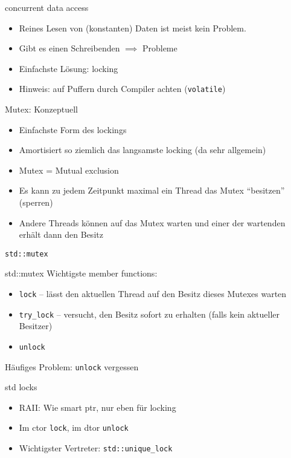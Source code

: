 \begin{frame}{concurrent data access}
	\begin{itemize}
		\item Reines Lesen von (konstanten) Daten ist meist kein Problem.
		\item Gibt es einen Schreibenden $\implies$ Probleme
		\item Einfachste Lösung: locking
		\item Hinweis: auf Puffern durch Compiler achten (\texttt{volatile})
	\end{itemize}
	
	\pause
	
	\begin{block}{Mutex: Konzeptuell}
		\begin{itemize}
			\item Einfachste Form des lockings
			\item Amortisiert so ziemlich das langsamste locking (da sehr allgemein)
			\item Mutex = Mutual exclusion
			\item Es kann zu jedem Zeitpunkt maximal ein Thread das Mutex \enquote{besitzen} (sperren)
			\item Andere Threads können auf das Mutex warten und einer der wartenden erhält dann den Besitz
		\end{itemize}
	\end{block}
\end{frame}

\begin{frame}{ \texttt{std::mutex} }
	\begin{block}{std::mutex}
		Wichtigste member functions:
		\begin{itemize}
			\item \texttt{lock} -- lässt den aktuellen Thread auf den Besitz dieses Mutexes warten
			\item \texttt{try\_lock} -- versucht, den Besitz sofort zu erhalten (falls kein aktueller Besitzer)
			\item \texttt{unlock}
		\end{itemize}
	\end{block}
	
	\pause
	
	\alert{Häufiges Problem: \texttt{unlock} vergessen}
	\begin{block}{std locks}
		\begin{itemize}
			\item RAII: Wie smart ptr, nur eben für locking
			\item Im ctor \texttt{lock}, im dtor \texttt{unlock}
			\item Wichtigster Vertreter: \texttt{std::unique\_lock}
		\end{itemize}
	\end{block}
\end{frame}

